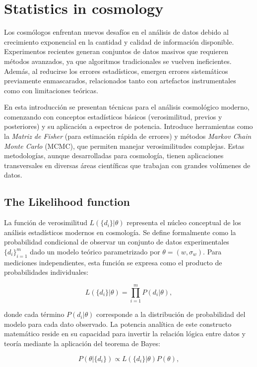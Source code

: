 \section{Statistics in cosmology}
Los cosmólogos enfrentan nuevos desafíos en el análisis de datos debido al crecimiento exponencial en la cantidad y calidad de información disponible. Experimentos recientes generan conjuntos de datos masivos que requieren métodos avanzados, ya que algoritmos tradicionales se vuelven ineficientes. Además, al reducirse los errores estadísticos, emergen errores sistemáticos previamente enmascarados, relacionados tanto con artefactos instrumentales como con limitaciones teóricas.

En esta introducción se presentan técnicas para el análisis cosmológico moderno, comenzando con conceptos estadísticos básicos (verosimilitud, previos y posteriores) y su aplicación a espectros de potencia. Introduce herramientas como la \textit{Matriz de Fisher} (para estimación rápida de errores) y métodos \textit{Markov Chain Monte Carlo} (MCMC), que permiten manejar verosimilitudes complejas. Estas metodologías, aunque desarrolladas para cosmología, tienen aplicaciones transversales en diversas áreas científicas que trabajan con grandes volúmenes de datos.

\subsection{The Likelihood function}
La función de verosimilitud $L(\{d_i\}|\theta)$ representa el núcleo conceptual de los análisis estadísticos modernos en cosmología. Se define formalmente como la probabilidad condicional de observar un conjunto de datos experimentales $\{d_i\}_{i=1}^m$ dado un modelo teórico parametrizado por $\theta = (w, \sigma_w)$. Para mediciones independientes, esta función se expresa como el producto de probabilidades individuales:

\begin{equation}
L(\{d_i\}|\theta) = \prod_{i=1}^m P(d_i|\theta), 
\end{equation}

donde cada término $P(d_i|\theta)$ corresponde a la distribución de probabilidad del modelo para cada dato observado. La potencia analítica de este constructo matemático reside en su capacidad para invertir la relación lógica entre datos y teoría mediante la aplicación del teorema de Bayes:

\begin{equation}
P(\theta|\{d_i\}) \propto L(\{d_i\}|\theta) P(\theta),
\end{equation}

